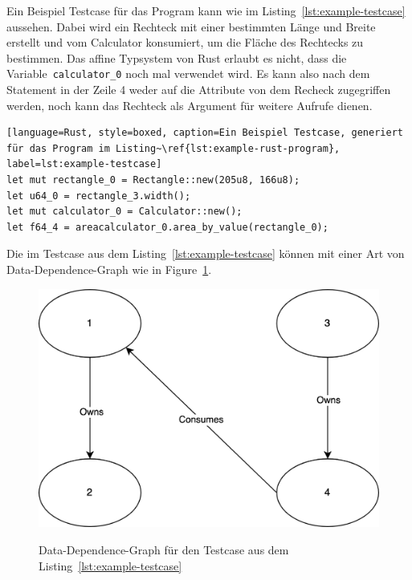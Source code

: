 \documentclass{article}
\begin{document}
Ein Beispiel Testcase für das Program kann wie im Listing~\ref{lst:example-testcase} aussehen. Dabei wird ein Rechteck mit einer bestimmten Länge und Breite erstellt und vom Calculator konsumiert, um die Fläche des Rechtecks zu bestimmen. Das affine Typsystem von Rust erlaubt es nicht, dass die Variable~\lstinline{calculator_0} noch mal verwendet wird. Es kann also nach dem Statement in der Zeile 4 weder auf die Attribute von dem Recheck zugegriffen werden, noch kann das Rechteck als Argument für weitere Aufrufe dienen.

\begin{lstlisting}[language=Rust, style=boxed, caption=Ein Beispiel Testcase, generiert für das Program im Listing~\ref{lst:example-rust-program}, label=lst:example-testcase]
let mut rectangle_0 = Rectangle::new(205u8, 166u8);
let u64_0 = rectangle_3.width();
let mut calculator_0 = Calculator::new();
let f64_4 = areacalculator_0.area_by_value(rectangle_0);
\end{lstlisting}

Die im Testcase aus dem Listing~\ref{lst:example-testcase} können mit einer Art von Data-Dependence-Graph wie in Figure~\ref{fig:ddg-example}.

\begin{figure}[h]
\caption{Data-Dependence-Graph für den Testcase aus dem Listing~\ref{lst:example-testcase}}
\centering
\includegraphics[width=\textwidth]{DDG}
\label{fig:ddg-example}
\end{figure}
\end{document}
